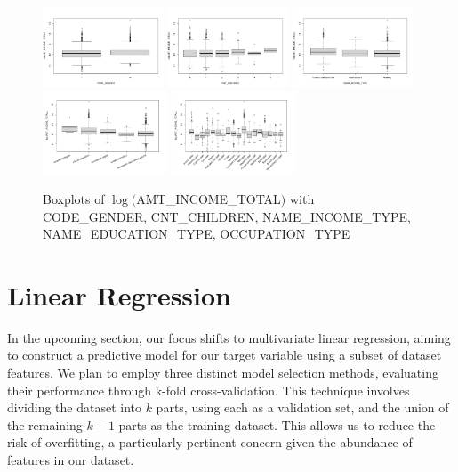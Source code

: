 \documentclass[12pt]{article}
\begin{document}
\begin{figure}[h]
  \begin{center}  
  \includegraphics[width=0.32\textwidth]{img/2daa959c-6376-414b-924e-58a36fff83c0.png}
  \includegraphics[width=0.32\textwidth]{img/13899894-d623-4e90-9e7d-6381dc539881.png}
  \includegraphics[width=0.32\textwidth]{img/940e0efd-067f-4e34-8644-973484182a88.png}
  \includegraphics[width=0.33\textwidth]{img/1271e581-93eb-4d7c-9104-d9551b0fdb9c.png}
  \includegraphics[width=0.33\textwidth]{img/25d6ee52-acab-4b30-840c-8b10b31d3b8d.png}
  \end{center}
\caption{Boxplots of $\log($AMT\_INCOME\_TOTAL$)$ with CODE\_GENDER, CNT\_CHILDREN, NAME\_INCOME\_TYPE, NAME\_EDUCATION\_TYPE, OCCUPATION\_TYPE}
\end{figure}
\newpage
\section{Linear Regression}
In the upcoming section, our focus shifts to multivariate linear regression, aiming to construct a predictive model for our target variable using a subset of dataset features. We plan to employ three distinct model selection methods, evaluating their performance through k-fold cross-validation. This technique involves dividing the dataset into $k$ parts, using each as a validation set, and the union of the remaining $k-1$ parts as the training dataset. This allows us to reduce the risk of overfitting, a particularly pertinent concern given the abundance of features in our dataset. 
\end{document}
